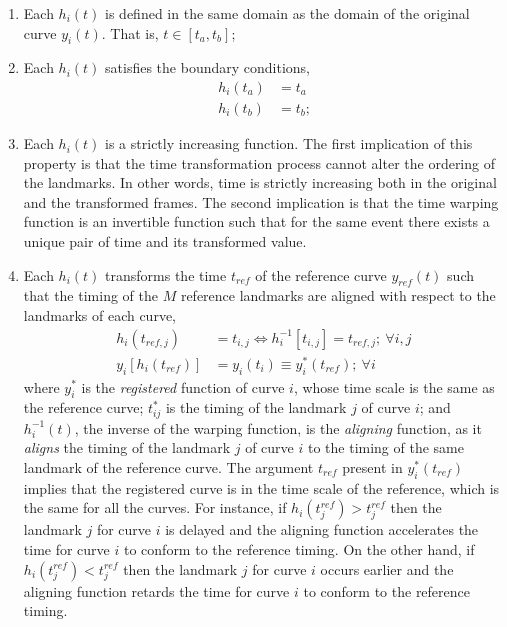 \begin{enumerate}
	
	\item Each $h_i(t)$ is defined in the same domain as the domain of the original curve $y_i(t)$. That is, $t \in [t_a, t_b]$;
  
	\item Each $h_i(t)$ satisfies the boundary conditions,
    \begin{equation}
      \begin{split}
        h_i(t_a) & = t_a \\
        h_i(t_b) & = t_b \text{;}
      \end{split}
    \label{eq:warping_boundaries}
    \end{equation}
   
	\item Each $h_i(t)$ is a strictly increasing function. The first implication of this property is that the time transformation process cannot alter the ordering of the landmarks.
         In other words, time is strictly increasing both in the original and the transformed frames.
         The second implication is that the time warping function is an invertible function 
         such that for the same event there exists a unique pair of time and its transformed value.
  
	\item Each $h_i(t)$ transforms the time $t_{ref}$ of the reference curve $y_{ref}(t)$ such that the timing of the $M$ reference landmarks are aligned with respect to the landmarks of each curve,
          \begin{equation}
            \begin{split}
						  h_i (t_{ref,j}) 		& = t_{i,j} \iff h_i^{-1}[t_{i,j}] = t_{ref,j}  ; \ \forall i,j \\
							y_i [h_i(t_{ref})]  & =	y_i(t_{i}) \equiv y^*_i(t_{ref}) ; \ \forall i
            \end{split}
          \label{eq:warping_transformation}
          \end{equation}
          where $y_i^*$ is the \emph{registered} function of curve $i$, whose time scale is the same as the reference curve;
					$t_{ij}^*$ is the timing of the landmark $j$ of curve $i$;
					and $h^{-1}_i(t)$, the inverse of the warping function, is the \emph{aligning} function, as it \emph{aligns} the timing of the landmark $j$ of curve $i$ to the timing of the same landmark of the reference curve. 
					The argument $t_{ref}$ present in $y_i^*(t_{ref})$ implies that the registered curve is in the time scale of the reference, which is the same for all the curves.
          For instance, if $h_i(t^{ref}_j) > t^{ref}_j$ then the landmark $j$ for curve $i$ is delayed 
          and the aligning function accelerates the time for curve $i$ to conform to the reference timing.
          On the other hand, if $h_i(t^{ref}_j) < t^{ref}_j$ then the landmark $j$ for curve $i$ occurs earlier
          and the aligning function retards the time for curve $i$ to conform to the reference timing.
\end{enumerate}

